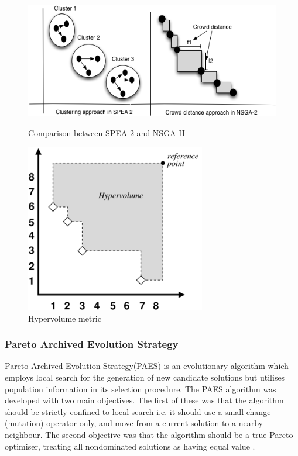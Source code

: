 \documentclass[espaco=umemeio,chapter=TITLE,twoside,openright]{abnt}
\begin{document}
\begin{figure}[h]
\begin{minipage}{.6\textwidth}
\centering
\includegraphics[width=1\textwidth]{./images/speansga.png}
\caption{Comparison between SPEA-2 and NSGA-II \cite{Deb2005}}
\label{fig:speansga}
\end{minipage}
\begin{minipage}{.4\textwidth}
\centering
\includegraphics[width=0.7\textwidth]{./images/hypervolume-annot.png}
\caption{Hypervolume metric \cite{Lacour2015}}
\label{fig:hypervolume}
\end{minipage}
\end{figure}


\subsubsection{Pareto Archived Evolution Strategy} 

Pareto Archived Evolution Strategy(PAES) is an  evolutionary algorithm which employs
local search for the generation of new candidate solutions but
utilises population information in its selection procedure. The PAES algorithm was developed with two main objectives. The first of these was that the algorithm should be strictly confined to local search i.e. it should use a small change (mutation) operator only, and move from a current solution to a nearby neighbour. The second objective was that the algorithm should be a true Pareto optimiser, treating all nondominated solutions as having equal value \cite{Knowles1999}.
\end{document}
